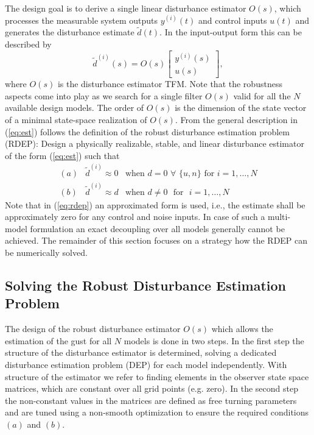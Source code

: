 \documentclass[graybox]{svmult}
\begin{document}
The design goal is to derive a single linear disturbance estimator $O(s)$, which processes the measurable system outputs $y^{(i)}(t)$ and control inputs $u(t)$ and generates the disturbance estimate $\tilde d(t)$. In the input-output form this can be described by
\begin{equation}\label{eq:est}
	\tilde d^{(i)}(s) = O(s)
	\begin{bmatrix}
		y^{(i)}(s) \\ u(s)
	\end{bmatrix},
\end{equation}
where $O(s)$ is the disturbance estimator TFM. Note that the robustness aspects come into play as we search for a single filter $O(s)$ valid for all the $N$ available design models.
The order of $O(s)$ is the dimension of the state vector of a minimal state-space realization of $O(s)$.
From the general description in (\ref{eq:est}) follows the definition of the robust disturbance estimation problem (RDEP): Design a physically realizable, stable, and linear disturbance estimator of the form (\ref{eq:est}) such that 
\begin{equation}\label{eq:rdep}
	\begin{array}{lll}
		(a) & \tilde d^{(i)}  \approx 0 &\text{when } d = 0  \,\, \forall  \,\, \{u, n \} \text{  for  } i=1,\dots,N\\ 
		(b) &\tilde d^{(i)} \approx d &\text{when } d \neq 0 \,\, \text{  for  } \,\, i=1,\dots,N 
	\end{array}
\end{equation}
Note that in (\ref{eq:rdep}) an approximated form is used, i.e., the estimate shall be approximately zero  for any control and noise inputs. In case of such a multi-model formulation an exact decoupling over all models generally cannot be achieved. The remainder of this section focuses on a strategy how the RDEP can be numerically solved. \vspace{-1mm}



\subsection{Solving the Robust Disturbance Estimation Problem}\label{sec:rdep}\vspace{-1mm}
The design of the robust disturbance estimator $O(s)$ which allows the estimation of the gust for all $N$ models is done in two steps. In the first step the structure of the disturbance estimator is determined, solving a dedicated disturbance estimation problem (DEP) for each model independently. 
With structure of the estimator we refer to finding elements in the observer state space matrices, which are constant over all grid points (e.g. zero). In the second step the non-constant values in the matrices are defined as free turning parameters and are tuned using a non-smooth optimization  to ensure the required conditions $(a)$ and $(b)$.\vspace{-1mm}
\end{document}
